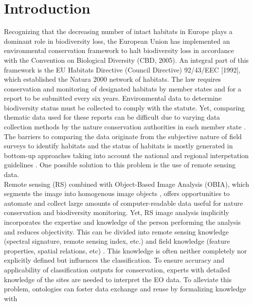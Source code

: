 \documentclass[authoryear, review,12pt,number]{elsarticle}
\begin{document}
\section{Introduction}  %
Recognizing that the decreasing number of
intact habitats in Europe  plays a dominant role in biodiversity loss, the
European Union has implemented an environmental conservation framework to halt
biodiversity loss in accordance with the Convention on Biological Diversity
(CBD, 2005). An integral part of this framework is the EU Habitats Directive
(Council Directive) 92/43/EEC [1992], which established the Natura 2000 network
of habitats. The law requires conservation and monitoring of designated habitats
by member states and for a report to be submitted every six years.
Environmental data to determine biodiversity status must be collected to comply
with the statute. Yet, comparing thematic data used for these reports can be
difficult due to varying data collection methods by the nature conservation
authorities in each member state \citep{INSPIREdataspecs, INSPIRE}. The barriers
to comparing the data originate from the subjective nature of field surveys to
identify habitats \citep{Cherrill1999, Cherrill1999a, Nieland2015, Nieland2016}
and the status of habitats is mostly generated in bottom-up approaches taking
into account the national and regional interpetation guidelines
\citep{INSPIREdataspecs}. One possible solution to this problem is the use of
remote sensing data. 
\\
Remote sensing (RS) combined with Object-Based Image
Analysis (OBIA), which segments the image into homogenous image objects
\citep{Blaschke2010}, offers opportunities to automate and collect large amounts
of computer-readable data useful for nature conservation \citep{Corbane2015,
VandenBorre2011, Mayer2011} and biodiversity monitoring. Yet, RS image analysis
implicitly incorporates the expertise and knowledge of the person performing the
analysis and reduces objectivity. This can be divided into remote sensing
knowledge (spectral signature, remote sensing index, etc.) and field
knowledge (feature properties, spatial relations, etc) \citep{Andres2013a}.
This knowledge is often neither completely nor explicitly defined but
influences the classification. To ensure accuracy and applicability of
classification outputs for conservation, experts with detailed knowledge of
the sites are needed to interpret the EO data. To alleviate this problem,
ontologies can foster data exchange and reuse by formalizing knowledge with
\end{document}
